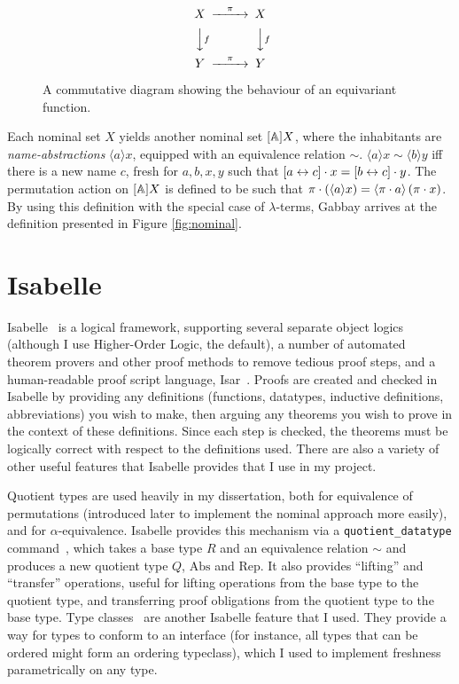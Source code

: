 \begin{figure}
\[
\begin{CD}
X	@>\pi>>	X\\
@VVfV		@VVfV\\
Y	@>\pi>>	Y
\end{CD}
\]
\caption{A commutative diagram showing the behaviour of an equivariant function.}
\label{fig:equivariant}
\end{figure}

Each nominal set \(X\) yields another nominal set \([\mathbb{A}]X\), where the inhabitants are \emph{name-abstractions} \(\langle a \rangle x\), equipped with an equivalence relation \(\sim\).
\(\langle a \rangle x \sim \langle b \rangle y\) iff there is a new name \(c\), fresh for \(a, b, x, y\) such that \([a \leftrightarrow c] \cdot x = [b \leftrightarrow c] \cdot y\).
The permutation action on \([\mathbb{A}]X\) is defined to be such that \(\pi \cdot \left(\langle a \rangle x\right) = \langle \pi \cdot a \rangle\left(\pi \cdot x\right)\).
By using this definition with the special case of \(\lambda\)-terms, Gabbay arrives at the definition presented in Figure \ref{fig:nominal}.

\section{Isabelle}
\label{sec:isabelle-intro}
Isabelle~\cite{isabelle} is a logical framework, supporting several separate object logics (although I use Higher-Order Logic, the default), a number of automated theorem provers and other proof methods to remove tedious proof steps, and a human-readable proof script language, Isar~\cite{isar-phd}.
Proofs are created and checked in Isabelle by providing any definitions (functions, datatypes, inductive definitions, abbreviations) you wish to make, then arguing any theorems you wish to prove in the context of these definitions.
Since each step is checked, the theorems must be logically correct with respect to the definitions used.
There are also a variety of other useful features that Isabelle provides that I use in my project.

Quotient types are used heavily in my dissertation, both for equivalence of permutations (introduced later to implement the nominal approach more easily), and for \(\alpha\)-equivalence.
Isabelle provides this mechanism via a \texttt{quotient\_datatype} command~\cite{isabelle-quotient}, which takes a base type \(R\) and an equivalence relation \(\sim\) and produces a new quotient type \(Q\), \(\mathrm{Abs}\) and \(\mathrm{Rep}\).
It also provides ``lifting'' and ``transfer'' operations, useful for lifting operations from the base type to the quotient type, and transferring proof obligations from the quotient type to the base type.
Type classes~\cite{isabelle-typeclasses} are another Isabelle feature that I used.
They provide a way for types to conform to an interface (for instance, all types that can be ordered might form an ordering typeclass), which I used to implement freshness parametrically on any type.

